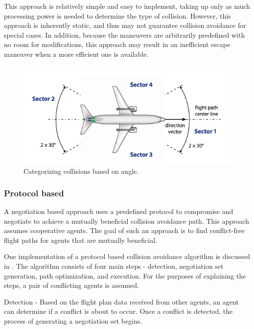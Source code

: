 \documentclass[conference]{IEEEtran}
\begin{document}
This approach is relatively simple and easy to implement, taking up only as much processing power is needed to determine the type of collision. However, this approach is inherently static, and thus may not guarantee collision avoidance for special cases. In addition, because the maneuvers are arbitrarily predefined with no room for modifications, this approach may result in an inefficient escape maneuver when a more efficient one is available. 
\begin{figure}[h]
	\includegraphics [width=1\columnwidth] {06SislakCollisionID}
	\caption{Categorizing collisions based on angle. \cite{sislak2006negotiation}}
	\label{fig:06SislakID}
\end{figure}
\subsubsection{Protocol based}

A negotiation based approach uses a predefined protocol to compromise and negotiate to achieve a mutually beneficial collision avoidance path. This approach assumes cooperative agents. The goal of such an approach is to find conflict-free flight paths for agents that are mutually beneficial.

One implementation of a protocol based collision avoidance algorithm is discussed in \cite{vsivslak2008agentfly}. The algorithm consists of four main steps - detection, negotiation set generation, path optimization, and execution. For the purposes of explaining the steps, a pair of conflicting agents is assumed.

Detection - Based on the flight plan data received from other agents, an agent can determine if a conflict is about to occur. Once a conflict is detected, the process of generating a negotiation set begins.
\end{document}
